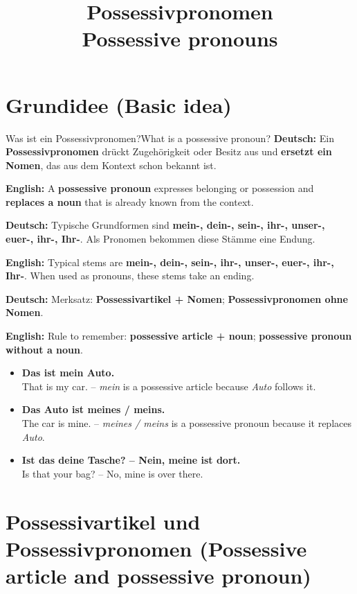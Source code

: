 \documentclass[a4paper,11pt]{article}
\title{Possessivpronomen\\\large Possessive pronouns}
\date{}
\newcommand{\GermanText}[1]{\textbf{Deutsch: }#1\par}
\newcommand{\EnglishText}[1]{{\small\color{SoftGray}\textbf{English: }#1\par}}
\newcommand{\ExampleItem}[2]{\item \textbf{#1}\\{\small\color{SoftGray}#2}}
\begin{document}
    \maketitle
    \tableofcontents
    \newpage

    \section{Grundidee \textnormal{(Basic idea)}}

        \begin{grammarentry}{Was ist ein Possessivpronomen?}{What is a possessive pronoun?}
            \GermanText{Ein \textbf{Possessivpronomen} drückt Zugehörigkeit oder Besitz aus und \textbf{ersetzt ein Nomen}, das aus dem Kontext schon bekannt ist.}
            \EnglishText{A \textbf{possessive pronoun} expresses belonging or possession and \textbf{replaces a noun} that is already known from the context.}

            \GermanText{Typische Grundformen sind \textbf{mein-, dein-, sein-, ihr-, unser-, euer-, ihr-, Ihr-}. Als Pronomen bekommen diese Stämme eine Endung.}
            \EnglishText{Typical stems are \textbf{mein-, dein-, sein-, ihr-, unser-, euer-, ihr-, Ihr-}. When used as pronouns, these stems take an ending.}

            \GermanText{Merksatz: \textbf{Possessivartikel + Nomen}; \textbf{Possessivpronomen ohne Nomen}.}
            \EnglishText{Rule to remember: \textbf{possessive article + noun}; \textbf{possessive pronoun without a noun}.}
        \end{grammarentry}

        \begin{exbox}
            \begin{itemize}
                \ExampleItem{Das ist mein Auto.}{That is my car. -- \textit{mein} is a possessive article because \textit{Auto} follows it.}
                \ExampleItem{Das Auto ist meines / meins.}{The car is mine. -- \textit{meines / meins} is a possessive pronoun because it replaces \textit{Auto}.}
                \ExampleItem{Ist das deine Tasche? -- Nein, meine ist dort.}{Is that your bag? -- No, mine is over there.}
            \end{itemize}
        \end{exbox}

    \section{Possessivartikel und Possessivpronomen \textnormal{(Possessive article and possessive pronoun)}}
\end{document}

